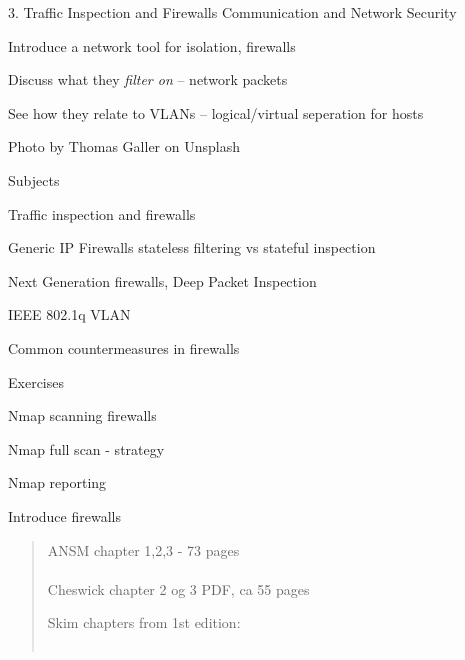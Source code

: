 \documentclass[Screen16to9,17pt]{foils}
\begin{document}
\mytitlepage
{3. Traffic Inspection and Firewalls}
{Communication and Network Security \the\year}




\begin{list2}
\item Introduce a network tool for isolation, firewalls
\item Discuss what they \emph{filter on} -- network packets
\item See how they relate to VLANs -- logical/virtual seperation for hosts
\end{list2}

Photo by Thomas Galler on Unsplash



\begin{list1}
\item Subjects
\begin{list2}
\item Traffic inspection and firewalls
\item Generic IP Firewalls stateless filtering vs stateful inspection
\item Next Generation firewalls, Deep Packet Inspection
\item IEEE 802.1q VLAN
\item Common countermeasures in firewalls
\end{list2}
\item Exercises
\begin{list2}
\item Nmap scanning firewalls
\item Nmap full scan - strategy
\item Nmap reporting
\end{list2}
\end{list1}

\centerline{\LARGE Introduce firewalls}


\begin{quote}
ANSM chapter 1,2,3 - 73 pages\\
\\
 Cheswick chapter 2 og 3 PDF, ca 55 pages
\item Skim chapters from 1st edition:\\
\\ 
\end{quote}
\end{document}
